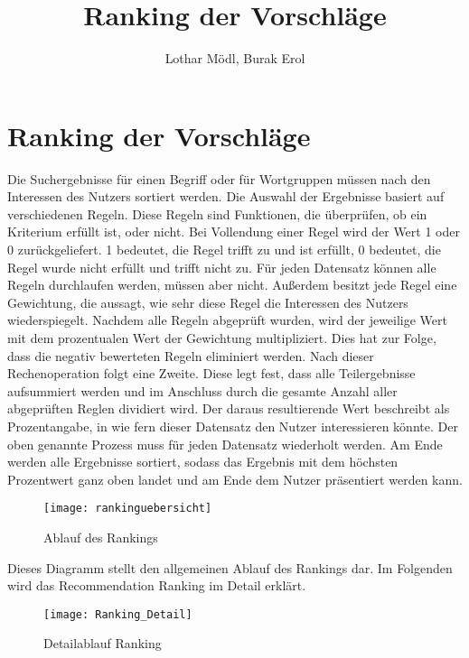 
\title{Ranking der Vorschläge}
\author{Lothar Mödl, Burak Erol}

\chapter{Ranking der Vorschläge}

Die Suchergebnisse für einen Begriff oder  für Wortgruppen müssen nach den Interessen des Nutzers sortiert werden. Die Auswahl der Ergebnisse basiert auf verschiedenen Regeln. Diese Regeln sind Funktionen, die überprüfen, ob ein Kriterium erfüllt ist, oder nicht. Bei Vollendung einer Regel wird der Wert 1 oder 0 zurückgeliefert. 1 bedeutet, die Regel trifft zu und ist erfüllt, 0 bedeutet, die Regel wurde nicht erfüllt und trifft nicht zu. Für jeden Datensatz können alle Regeln durchlaufen werden, müssen aber nicht. Außerdem besitzt jede Regel eine Gewichtung, die aussagt, wie sehr diese Regel die Interessen des Nutzers wiederspiegelt. Nachdem alle Regeln abgeprüft wurden, wird der jeweilige Wert mit dem prozentualen Wert der Gewichtung multipliziert. Dies hat zur Folge, dass die negativ bewerteten Regeln eliminiert werden. Nach dieser Rechenoperation folgt eine Zweite. Diese legt fest, dass alle Teilergebnisse aufsummiert werden und im Anschluss durch die gesamte Anzahl aller abgeprüften Reglen dividiert wird. Der daraus resultierende Wert beschreibt als Prozentangabe, in wie fern dieser Datensatz den Nutzer interessieren könnte. Der oben genannte Prozess muss für jeden Datensatz wiederholt werden. Am Ende werden alle Ergebnisse sortiert, sodass das Ergebnis mit dem höchsten Prozentwert ganz oben landet und am Ende dem Nutzer präsentiert werden kann. 

\begin{figure}
	\centering
	\texttt{[image: rankinguebersicht]}
	\caption{Ablauf des Rankings}
	\label{fig:Rankingablauf}
\end{figure}

Dieses Diagramm stellt den allgemeinen Ablauf des Rankings dar. Im Folgenden wird das Recommendation Ranking im Detail erklärt. 

\begin{figure}
	\centering
	\texttt{[image: Ranking\_Detail]}
	\caption{Detailablauf Ranking}
	\label{fig:Detailablauf}
\end{figure}